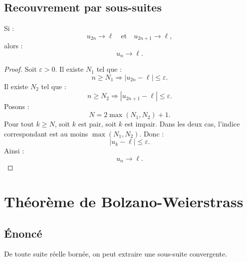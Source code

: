 \documentclass[11pt,a4paper]{article}
\newcommand{\abs}[1]{\left|#1\right|}
\newcommand{\implique}{\Longrightarrow}
\begin{document}
\subsection{Recouvrement par sous-suites}

\begin{theorembox}
Si :
\[
u_{2n}\to\ell
\quad\text{et}\quad
u_{2n+1}\to\ell,
\]
alors :
\[
u_n\to\ell.
\]
\end{theorembox}

\begin{proof}
Soit \(\varepsilon>0\).  
Il existe \(N_1\) tel que :
\[
n\geq N_1\implique \abs{u_{2n}-\ell}\leq\varepsilon.
\]
Il existe \(N_2\) tel que :
\[
n\geq N_2\implique \abs{u_{2n+1}-\ell}\leq\varepsilon.
\]
Posons :
\[
N=2\max(N_1,N_2)+1.
\]
Pour tout \(k\geq N\), soit \(k\) est pair, soit \(k\) est impair.  
Dans les deux cas, l'indice correspondant est au moins \(\max(N_1,N_2)\).  
Donc :
\[
\abs{u_k-\ell}\leq\varepsilon.
\]
Ainsi :
\[
u_n\to\ell.
\]
\end{proof}

\section{Théorème de Bolzano-Weierstrass}

\subsection{Énoncé}

\begin{theorembox}
De toute suite réelle bornée, on peut extraire une sous-suite convergente.
\end{theorembox}
\end{document}
